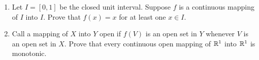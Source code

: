 \documentclass[../psets.tex]{subfiles}
\begin{document}
\begin{enumerate}[label={\textbf{\arabic*.}}]
    \item Let $I=[0,1]$ be the closed unit interval. Suppose $f$ is a continuous mapping of $I$ into $I$. Prove that $f(x)=x$ for at least one $x\in I$.
    \item Call a mapping of $X$ into $Y$ open if $f(V)$ is an open set in $Y$ whenever $V$ is an open set in $X$. Prove that every continuous open mapping of $\mathbb{R}^1$ into $\mathbb{R}^1$ is monotonic.
\end{enumerate}
\end{document}
